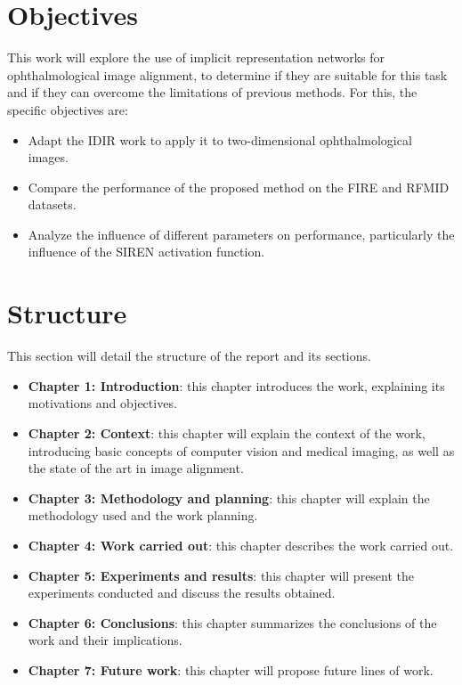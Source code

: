 \section{Objectives}
\label{sec:obxectivos}

This work will explore the use of implicit representation networks for ophthalmological image alignment, to determine if they are suitable for this task and if they can overcome the limitations of previous methods.
For this, the specific objectives are:
\begin{itemize}
    \item Adapt the IDIR work \cite{wolterink2021implicit} to apply it to two-dimensional ophthalmological images.
    \item Compare the performance of the proposed method on the FIRE \cite{FIRE} and RFMID \cite{RFMiD} datasets.
    \item Analyze the influence of different parameters on performance, particularly the influence of the SIREN activation function.
\end{itemize}

\section{Structure}
\label{sec:estrutura}

This section will detail the structure of the report and its sections.

\begin{itemize}
    \item \textbf{Chapter 1: Introduction}: this chapter introduces the work, explaining its motivations and objectives.
    \item \textbf{Chapter 2: Context}: this chapter will explain the context of the work, introducing basic concepts of computer vision and medical imaging, as well as the state of the art in image alignment.
    \item \textbf{Chapter 3: Methodology and planning}: this chapter will explain the methodology used and the work planning.
    \item \textbf{Chapter 4: Work carried out}: this chapter describes the work carried out.
    \item \textbf{Chapter 5: Experiments and results}: this chapter will present the experiments conducted and discuss the results obtained.
    \item \textbf{Chapter 6: Conclusions}: this chapter summarizes the conclusions of the work and their implications.
    \item \textbf{Chapter 7: Future work}: this chapter will propose future lines of work.
\end{itemize}